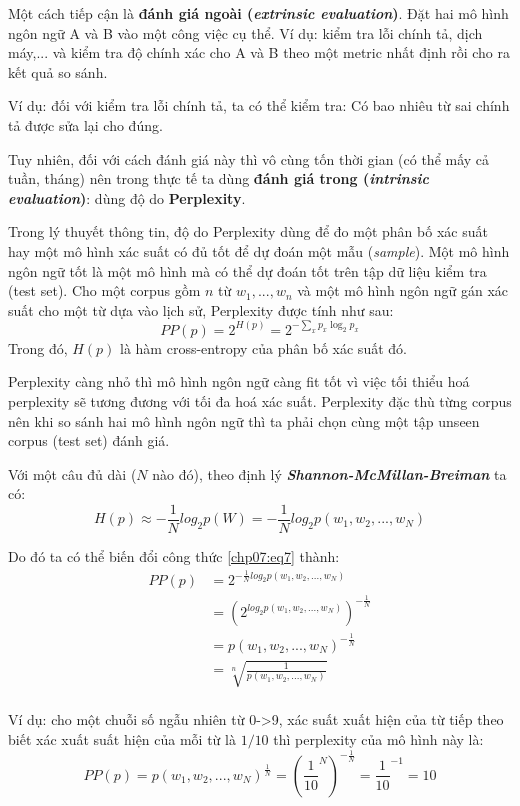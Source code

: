 Một cách tiếp cận là \textbf{đánh giá ngoài (\textit{extrinsic evaluation})}. Đặt hai mô hình ngôn ngữ A và B vào một công việc cụ thể. Ví dụ: kiểm tra lỗi chính tả, dịch máy,... và kiểm tra độ chính xác cho A và B theo một metric nhất định rồi cho ra kết quả so sánh.

Ví dụ: đối với kiểm tra lỗi chính tả, ta có thể kiểm tra: Có bao nhiêu từ sai chính tả được sửa lại cho đúng.

Tuy nhiên, đối với cách đánh giá này thì vô cùng tốn thời gian (có thể mấy cả tuần, tháng) nên trong thực tế ta dùng \textbf{đánh giá trong (\textit{intrinsic evaluation})}: dùng độ do \textbf{Perplexity}.

Trong lý thuyết thông tin, độ do Perplexity dùng để đo một phân bố xác suất hay một mô hình xác suất có đủ tốt để dự đoán một mẫu (\textit{sample}). Một mô hình ngôn ngữ tốt là một mô hình mà có thể dự đoán tốt trên tập dữ liệu kiểm tra (test set). Cho một corpus gồm $n$ từ $w_1,...,w_n$ và một mô hình ngôn ngữ gán xác suất cho một từ dựa vào lịch sử, Perplexity được tính như sau:
\begin{equation}
\label{chp07:eq7}
PP(p)=2^{H(p)}=2^{-\sum_{x}^{}p_x\log_2p_x}
\end{equation}
Trong đó, $H(p)$ là hàm cross-entropy của phân bố xác suất đó.

Perplexity càng nhỏ thì mô hình ngôn ngữ càng fit tốt vì việc tối thiểu hoá perplexity sẽ tương đương với tối đa hoá xác suất. Perplexity đặc thù từng corpus nên khi so sánh hai mô hình ngôn ngữ thì ta phải chọn cùng một tập unseen corpus (test set) đánh giá.

Với một câu đủ dài ($N$ nào đó), theo định lý \textbf{\textit{Shannon-McMillan-Breiman}} ta có:
$$H(p)\approx-\frac{1}{N}log_2p(W)=-\frac{1}{N}log_2p(w_1,w_2,...,w_N)$$

Do đó ta có thể biến đổi công thức \ref{chp07:eq7} thành:
\begin{equation}
\begin{split}
PP(p)&=2^{-\frac{1}{N}log_2p(w_1,w_2,...,w_N)}\\
&=(2^{log_2p(w_1,w_2,...,w_N)})^{-\frac{1}{N}}\\
&=p(w_1,w_2,...,w_N)^{-\frac{1}{N}}\\
&=  \sqrt[n]{\frac{1}{p(w_1,w_2,...,w_N)}}\\
\end{split}
\end{equation}

Ví dụ: cho một chuỗi số ngẫu nhiên từ 0->9, xác suất xuất hiện của từ tiếp theo biết xác xuất suất hiện của mỗi từ là $1/10$ thì perplexity của mô hình này là:
$$PP(p)=p(w_1,w_2,...,w_N)^{\frac{1}{N}}=(\frac{1}{10}^N)^{-\frac{1}{N}}=\frac{1}{10}^{-1}=10$$

